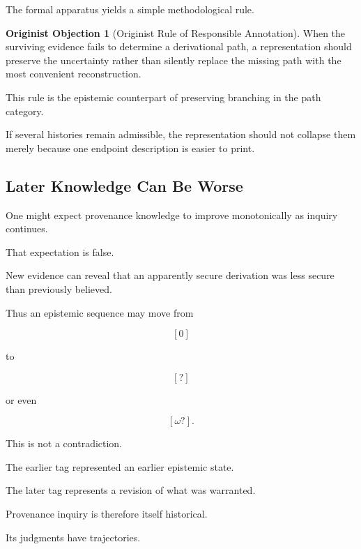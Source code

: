 \documentclass[
  11pt,
  a4paper,
  DIV=12,
  BCOR=0mm,
  parskip=half-
]{scrartcl}
\theoremstyle{definition}
\newtheorem{objection}[definition]{Originist Objection}
\theoremstyle{plain}
\theoremstyle{remark}
\begin{document}
The formal apparatus yields a simple methodological rule.

\begin{objection}[Originist Rule of Responsible Annotation]
When the surviving evidence fails to determine a derivational path, a
representation should preserve the uncertainty rather than silently replace
the missing path with the most convenient reconstruction.
\end{objection}

This rule is the epistemic counterpart of preserving branching in the path
category.

If several histories remain admissible, the representation should not collapse
them merely because one endpoint description is easier to print.


\subsection{Later Knowledge Can Be Worse}
\label{app:nonmonotone-provenance}

One might expect provenance knowledge to improve monotonically as inquiry
continues.

That expectation is false.

New evidence can reveal that an apparently secure derivation was less secure
than previously believed.

Thus an epistemic sequence may move from

\[
  [0]
\]

to

\[
  [?]
\]

or even

\[
  [\omega?].
\]

This is not a contradiction.

The earlier tag represented an earlier epistemic state.

The later tag represents a revision of what was warranted.

Provenance inquiry is therefore itself historical.

Its judgments have trajectories.

\end{document}

